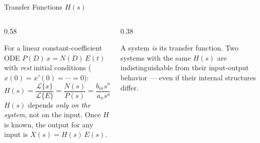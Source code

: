 \documentclass[aspectratio=169,11pt]{beamer}
\begin{document}
\begin{frame}{Transfer Functions $H(s)$}
\footnotesize
\begin{columns}[T]
\begin{column}{0.58\textwidth}
\begin{formulabox}[Definition]
For a linear constant-coefficient ODE $P(D)\,x = N(D)\,E(t)$ with \emph{rest} initial conditions ($x(0) = x'(0) = \cdots = 0$):
\[H(s) = \frac{\mathcal{L}\{x\}}{\mathcal{L}\{E\}} = \frac{N(s)}{P(s)} = \frac{b_m s^m + \cdots + b_0}{a_n s^n + \cdots + a_0}\]
$H(s)$ depends \emph{only on the system}, not on the input. Once $H$ is known, the output for any input is $X(s) = H(s)\,E(s)$.
\end{formulabox}
\end{column}
\begin{column}{0.38\textwidth}
\centering
{}
\vspace{3mm}
\begin{conceptbox}
A system \emph{is} its transfer function. Two systems with the same $H(s)$ are indistinguishable from their input-output behavior --- even if their internal structures differ.
\end{conceptbox}
\end{column}
\end{columns}
\end{frame}
\end{document}
